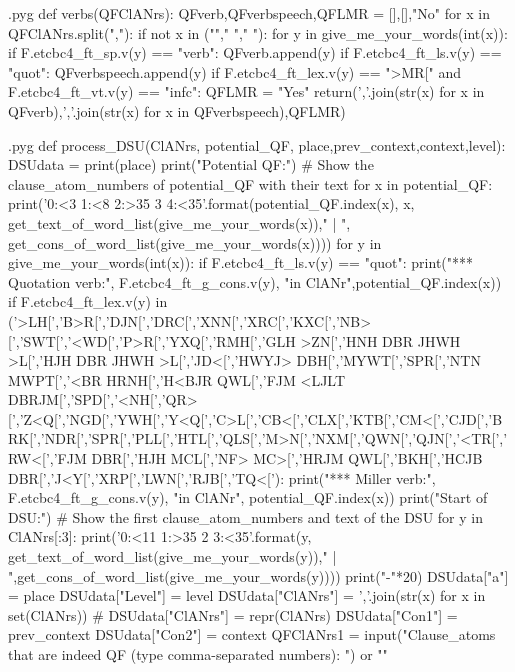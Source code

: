 \documentclass{report}
\makeatletter
\newenvironment{python}{%
  \VerbatimEnvironment
  \minted@resetoptions
  \setkeys{minted@opt}{}
      \begin{VerbatimOut}{\jobname.pyg}}
{%
      \end{VerbatimOut}
      \minted@pygmentize{python}
      \DeleteFile{\jobname.pyg}}
\makeatother
\begin{document}
\begin{python}
def verbs(QFClANrs):
    QFverb,QFverbspeech,QFLMR = [],[],"No"
    for x in QFClANrs.split(","):
        if not x in (""," ","  "):
            for y in give_me_your_words(int(x)):
                if F.etcbc4_ft_sp.v(y) == "verb":
                    QFverb.append(y)
                    if F.etcbc4_ft_ls.v(y) == "quot":
                        QFverbspeech.append(y)
                        if F.etcbc4_ft_lex.v(y) == ">MR[" and F.etcbc4_ft_vt.v(y) == "infc":
                            QFLMR = "Yes"
    return(','.join(str(x) for x in QFverb),','.join(str(x) for x in QFverbspeech),QFLMR)

\end{python}

\begin{python}
def process_DSU(ClANrs, potential_QF, place,prev_context,context,level):
    DSUdata = {}
    print(place)
    print("Potential QF:")  # Show the clause_atom_numbers of potential_QF with their text
    for x in potential_QF:
        print('{0:<3} {1:<8} {2:>35} {3} {4:<35}'.format(potential_QF.index(x), x, get_text_of_word_list(give_me_your_words(x))," | ", get_cons_of_word_list(give_me_your_words(x))))
        for y in give_me_your_words(int(x)):
            if F.etcbc4_ft_ls.v(y) == "quot":
                print("*** Quotation verb:", F.etcbc4_ft_g_cons.v(y), "in ClANr",potential_QF.index(x))
            if F.etcbc4_ft_lex.v(y) in ('>LH[','B>R[','DJN[','DRC[','XNN[','XRC[','KXC[','NB>[','SWT[','<WD[','P>R[','YXQ[','RMH[','GLH >ZN[','HNH DBR JHWH >L[','HJH DBR JHWH >L[','JD<[','HWYJ> DBH[','MYWT[','SPR[','NTN MWPT[','<BR HRNH[','H<BJR QWL[','FJM <LJLT DBRJM[','SPD[','<NH[','QR>[','Z<Q[','NGD[','YWH[','Y<Q[','C>L[','CB<[','CLX[','KTB[','CM<[','CJD[','BRK[','NDR[','SPR[','PLL[','HTL[','QLS[','M>N[','NXM[','QWN[','QJN[','<TR[','RW<[','FJM DBR[','HJH MCL[','NF> MC>[','HRJM QWL[','BKH[','HCJB DBR[','J<Y[','XRP[','LWN[','RJB[','TQ<['):
                print("*** Miller verb:", F.etcbc4_ft_g_cons.v(y), "in ClANr", potential_QF.index(x))
    print("Start of DSU:")  # Show the first clause_atom_numbers and text of the DSU
    for y in ClANrs[:3]:
        print('{0:<11} {1:>35} {2} {3:<35}'.format(y, get_text_of_word_list(give_me_your_words(y))," | ",get_cons_of_word_list(give_me_your_words(y))))
    print("-"*20)
    DSUdata["a"] = place
    DSUdata["Level"] = level
    DSUdata["ClANrs"] = ','.join(str(x) for x in set(ClANrs))
#    DSUdata["ClANrs"] = repr(ClANrs)
    DSUdata["Con1"] = prev_context
    DSUdata["Con2"] = context
    QFClANrs1 = input("Clause_atoms that are indeed QF (type comma-separated numbers): ") or ""

\end{python}
\end{document}
